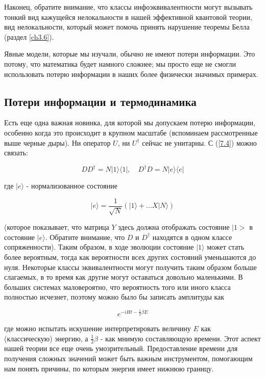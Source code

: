 \documentclass[main.tex]{subfiles}
\begin{document}
Наконец, обратите внимание, что классы инфоэквивалентности могут вызывать тонкий вид кажущейся нелокальности в нашей эффективной квантовой теории, вид нелокальности, который может помочь принять нарушение теоремы Белла (раздел \ref{ch3.6}).

Явные модели, которые мы изучали, обычно не имеют потери информации. Это потому, что математика будет намного сложнее; мы просто еще не смогли использовать потерю информации в наших более физически значимых примерах.

\subsection{Потери информации и термодинамика}\label{ch7.4}

Есть еще одна важная новинка, для которой мы допускаем потерю информации, особенно когда это происходит в крупном масштабе (вспоминаем рассмотренные выше черные дыры). Ни оператор $U$, ни $U^\dagger$ сейчас не унитарны. С (\ref{7.4}) можно связать:

\begin{equation}\label{7.7}
	DD^\dagger = N |1\rangle \langle 1|,\quad D^\dagger D= N |e\rangle \langle e|
\end{equation}
                          
где $|e \rangle$ - нормализованное состояние

\begin{equation}\label{7.8}
	|e \rangle = \frac 1 {\sqrt{N}} \left( |1 \rangle + ...X|N \rangle\right)
\end{equation}
           
(которое показывает, что матрица $Y$ здесь должна отображать состояние $|1>$ в состояние $|e \rangle$. Обратите внимание, что $D$ и $D^\dagger$ находятся в одном классе сопряженности). Таким образом, в ходе эволюции состояние $|1\rangle$ может стать более вероятным, тогда как вероятности всех других состояний уменьшаются до нуля. Некоторые классы эквивалентности могут получить  таким образом больше слагаемых, в то время как другие могут оставаться довольно маленькими. В больших системах маловероятно, что вероятность того или иного класса полностью исчезнет, поэтому можно было бы записать амплитуды как

\begin{equation}\label{7.9}
	e^{-iHt - \frac 1 2 \beta E}
\end{equation}
          
где можно испытать искушение интерпретировать величину $E$ как (классическую) энергию, а $\frac 1 2 \beta$ - как мнимую составляющую времени. Этот аспект нашей теории все еще очень умозрительный. Предоставление времени для получения сложных значений может быть важным инструментом, помогающим нам понять причины, по которым энергия имеет нижнюю границу.
\end{document}

